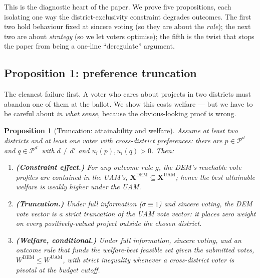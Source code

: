 \documentclass[11pt,letterpaper]{article}
\theoremstyle{definition}
\theoremstyle{plain}
\newtheorem{proposition}{Proposition}[section]
\theoremstyle{remark}
\newcommand{\Pset}{\mathcal{P}}
\newcommand{\DEM}{\text{DEM}}
\newcommand{\UAM}{\text{UAM}}
\begin{document}
This is the diagnostic heart of the paper. We prove five propositions, each isolating one way the
district-exclusivity constraint degrades outcomes. The first two hold behaviour fixed at sincere
voting (so they are about the \emph{rule}); the next two are about \emph{strategy} (so we let
voters optimise); the fifth is the twist that stops the paper from being a one-line ``deregulate''
argument.

\subsection{Proposition 1: preference truncation}

The cleanest failure first. A voter who cares about projects in two districts must abandon one of
them at the ballot. We show this costs welfare --- but we have to be careful about \emph{in what
sense}, because the obvious-looking proof is wrong.

\begin{proposition}[Truncation: attainability and welfare]
\label{prop:trunc}
Assume at least two districts and at least one voter with \emph{cross-district preferences}:
there are $p\in\Pset^d$ and $q\in\Pset^{d'}$ with $d\ne d'$ and $u_i(p),u_i(q)>0$. Then:
\begin{enumerate}[label=\textup{(\roman*)},nosep]
  \item \textbf{(Constraint effect.)} For any outcome rule $g$, the DEM's reachable vote profiles
        are contained in the UAM's, $\mathbf{X}^{\DEM}\subseteq\mathbf{X}^{\UAM}$; hence the
        \emph{best attainable} welfare is weakly higher under the UAM.
  \item \textbf{(Truncation.)} Under full information ($\sigma\equiv1$) and sincere voting, the
        DEM vote vector is a strict truncation of the UAM vote vector: it places zero weight on
        every positively-valued project outside the chosen district.
  \item \textbf{(Welfare, conditional.)} Under full information, sincere voting, \emph{and} an
        outcome rule that funds the welfare-best feasible set given the submitted votes,
        $W^{\DEM}\le W^{\UAM}$, with strict inequality whenever a cross-district voter is pivotal
        at the budget cutoff.
\end{enumerate}
\end{proposition}
\end{document}
